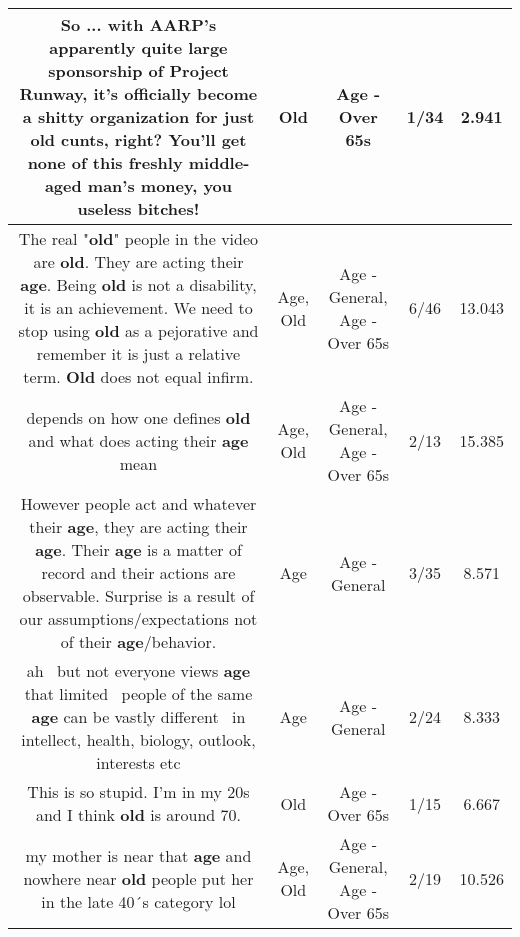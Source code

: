 \documentclass[11pt]{article}
\newlength\mylength
\begin{document}
\begin{center}
\begin{longtable}{|C{.65\mylength}|C{.30\mylength}|C{.12\mylength}|C{.12\mylength}|C{.12\mylength}|}
  \small So ... with AARP's apparently quite large sponsorship of Project Runway, it's officially become a shitty organization for just \textbf{old} cunts, right? You'll get none of this freshly middle-aged man's money, you useless bitches!\normalsize   & Old & Age - Over 65s & 1/34 & 2.941 \\  \hline
  \small The real "\textbf{old}" people  in the video are \textbf{old}.  They are acting their \textbf{age}.  Being \textbf{old} is not a disability, it is an achievement.  We need to stop using \textbf{old} as a pejorative and remember it is just a relative term.  \textbf{Old} does not equal infirm.\normalsize   & Age, Old & Age - General, Age - Over 65s & 6/46 & 13.043 \\  \hline
  \small depends on how one defines \textbf{old}  and what does acting their \textbf{age} mean\normalsize   & Age, Old & Age - General, Age - Over 65s & 2/13 & 15.385 \\  \hline
  \small However people act and whatever their \textbf{age}, they are acting their \textbf{age}.  Their \textbf{age} is a matter of record and their actions are observable.  Surprise is a result of our assumptions/expectations not of their \textbf{age}/behavior.\normalsize   & Age & Age - General & 3/35 & 8.571 \\  \hline
  \small ah  but not everyone views \textbf{age} that limited  people of the same \textbf{age} can be vastly different  in intellect, health, biology, outlook, interests etc\normalsize   & Age & Age - General & 2/24 & 8.333 \\  \hline
  \small This is so stupid. I'm in my 20s and I think \textbf{old} is around 70.\normalsize   & Old & Age - Over 65s & 1/15 & 6.667 \\  \hline
  \small my mother is near that \textbf{age}  and nowhere near \textbf{old}  people put her in the late 40´s category   lol\normalsize   & Age, Old & Age - General, Age - Over 65s & 2/19 & 10.526 \\  \hline

\end{longtable}
\end{center}
\end{document}
